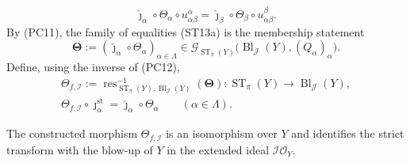 \begin{definition}
  \[
    \widehat\jmath_\alpha\circ\Theta_\alpha\circ
      u_{\alpha\beta}^\alpha
      =\widehat\jmath_\beta\circ\Theta_\beta\circ
        u_{\alpha\beta}^\beta.                                  \tag{ST13a}
  \]
  By (PC11), the family of equalities (ST13a) is the membership statement
  \[
    \mathbf\Theta:=
      (\widehat\jmath_\alpha\circ\Theta_\alpha)_{\alpha\in\Lambda}
      \in\mathscr G_{\operatorname{ST}_\pi(Y)}
        \bigl(\operatorname{Bl}_{\mathcal J}(Y),(Q_\alpha)_\alpha\bigr).
                                                                    \tag{ST14}
  \]
  Define, using the inverse of (PC12),
  \[
  \begin{gathered}
    \Theta_{f,\mathcal I}:=
      \operatorname{res}_{\operatorname{ST}_\pi(Y),
        \operatorname{Bl}_{\mathcal J}(Y)}^{-1}(\mathbf\Theta)
      \colon\operatorname{ST}_\pi(Y)\longrightarrow
        \operatorname{Bl}_{\mathcal J}(Y),\\
    \Theta_{f,\mathcal I}\circ\jmath_\alpha^{\mathrm{st}}
      =\widehat\jmath_\alpha\circ\Theta_\alpha
      \qquad(\alpha\in\Lambda).                                
  \end{gathered} \tag{ST15}
  \]
\end{definition}

\begin{theorem}
  \label{thm:nagata-strict-transform-is-blowup}
  \lean{}

  The constructed morphism $\Theta_{f,\mathcal I}$ is an isomorphism over
  $Y$ and identifies the strict transform with the blow-up of $Y$ in the
  extended ideal $\mathcal I\mathcal O_Y$.
\end{theorem}

